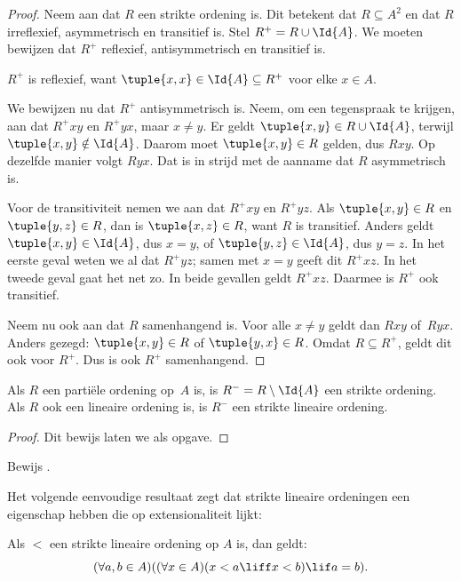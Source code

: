 \documentclass[openany]{memoir}
\begin{document}
\begin{proof}
Neem aan dat $R$ een strikte ordening is. Dit betekent dat $R \subseteq A^2$ en
dat $R$ irreflexief, asymmetrisch en transitief is. Stel
$R^+ = R \cup \Id{A}$. We moeten bewijzen dat $R^+$ reflexief,
antisymmetrisch en transitief is.

$R^+$ is reflexief, want $\tuple{x, x} \in \Id{A} \subseteq R^+$ voor elke
$x \in A$. 

We bewijzen nu dat $R^+$ antisymmetrisch is. Neem, om een tegenspraak te krijgen,
aan dat $R^+xy$ en $R^+yx$, maar $x \neq y$. Er geldt
$\tuple{x,y} \in R \cup \Id{A}$, terwijl $\tuple{x, y} \notin \Id{A}$.
Daarom moet $\tuple{x, y} \in R$ gelden, dus $Rxy$. Op dezelfde manier volgt
$Ryx$. Dat is in strijd met de aanname dat $R$ asymmetrisch is.

Voor de transitiviteit nemen we aan dat $R^+xy$ en $R^+yz$. Als
$\tuple{x, y} \in R$ en $\tuple{y,z} \in R$, dan is $\tuple{x, z} \in R$,
want $R$ is transitief. Anders geldt $\tuple{x, y} \in \Id{A}$, dus $x = y$,
of $\tuple{y, z} \in \Id{A}$, dus $y = z$. In het eerste geval weten we al dat
$R^+yz$; samen met $x = y$ geeft dit $R^+xz$. In het tweede geval gaat het
net zo. In beide gevallen geldt $R^+xz$. Daarmee is $R^+$ ook transitief.

Neem nu ook aan dat $R$ samenhangend is.
Voor alle $x \neq y$ geldt dan $Rxy$ of~$Ryx$. Anders gezegd:
$\tuple{x, y} \in R$ of $\tuple{y, x} \in R$. Omdat $R \subseteq R^+$,
geldt dit ook voor $R^+$. Dus is ook $R^+$ samenhangend.
\end{proof}

\begin{prop}
Als $R$ een partiële ordening op~$A$ is, is $R^- = R \setminus \Id{A}$ een
strikte ordening. Als $R$ ook een lineaire ordening is, is $R^-$ een strikte
lineaire ordening.
\end{prop}

\begin{proof}
Dit bewijs laten we als opgave.
\end{proof}

\begin{prob}
Bewijs . 
\end{prob}

Het volgende eenvoudige resultaat zegt dat strikte lineaire ordeningen een
eigenschap hebben die op extensionaliteit lijkt:

\begin{prop}
Als $<$ een strikte lineaire ordening op $A$ is, dan geldt:
\[
  (\forall a, b \in A)((\forall x \in A)(x < a \liff x < b) \lif a = b).
\]
\end{prop}
\end{document}
